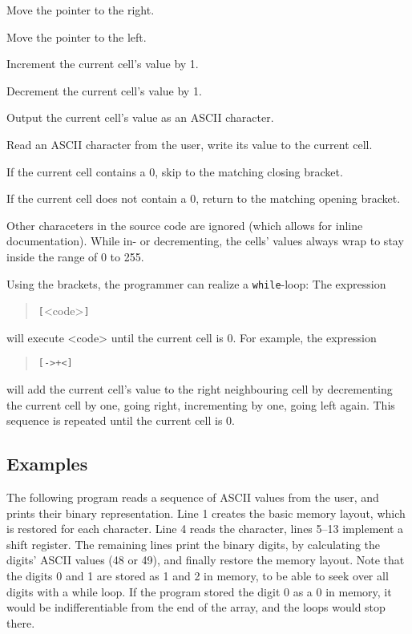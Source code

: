 \begin{description}[labelsep=1em]
    \item[\texttt{>}] Move the pointer to the right.
    \item[\texttt{<}] Move the pointer to the left.
    \item[\texttt{+}] Increment the current cell's value by 1.
    \item[\texttt{-}] Decrement the current cell's value by 1.
    \item[\texttt{.}] Output the current cell's value as an ASCII character.
    \item[\texttt{,}] Read an ASCII character from the user, write its value to the current cell.
    \item[\texttt{[}] If the current cell contains a 0, skip to the matching closing bracket.
    \item[\texttt{]}] If the current cell does not contain a 0, return to the matching opening bracket.
\end{description}

Other characeters in the source code are ignored (which allows for inline documentation). While in- or decrementing, the cells' values always wrap to stay inside the range of 0 to 255.

Using the brackets, the programmer can realize a \texttt{while}-loop: The expression

\begin{quotation}
    \texttt{[}<code>\texttt{]}
\end{quotation}

will execute <code> until the current cell is 0. For example, the expression

\begin{quotation}
    \texttt{[->+<]}
\end{quotation}

will add the current cell's value to the right neighbouring cell by decrementing the current cell by one, going right, incrementing by one, going left again. This sequence is repeated until the current cell is 0.

\subsection{Examples}

The following program reads a sequence of ASCII values from the user, and prints their binary representation. Line 1 creates the basic memory layout, which is restored for each character. Line 4 reads the character, lines 5--13 implement a shift register. The remaining lines print the binary digits, by calculating the digits' ASCII values (48 or 49), and finally restore the memory layout. Note that the digits 0 and 1 are stored as 1 and 2 in memory, to be able to seek over all digits with a while loop. If the program stored the digit 0 as a 0 in memory, it would be indifferentiable from the end of the array, and the loops would stop there.

